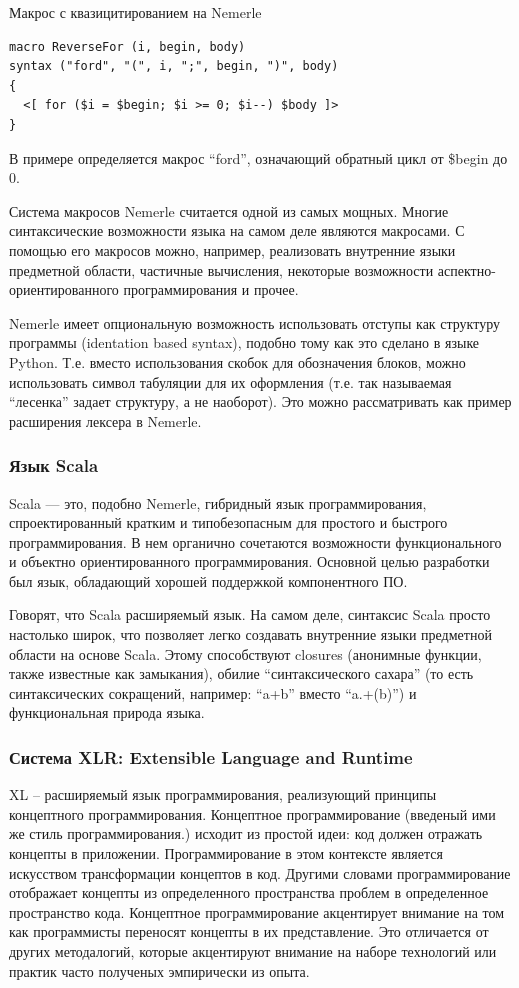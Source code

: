 \documentclass[a4paper,12pt,titlepage]{extarticle}
\begin{document}
Макрос с квазицитированием на Nemerle
\begin{verbatim}
macro ReverseFor (i, begin, body) 
syntax ("ford", "(", i, ";", begin, ")", body)
{
  <[ for ($i = $begin; $i >= 0; $i--) $body ]>
}
\end{verbatim}
В примере определяется макрос ``ford'', означающий обратный цикл от \$begin до
0.

Система макросов Nemerle считается одной из самых мощных. Многие
синтаксические возможности языка на самом деле являются макросами. С помощью
его макросов можно, например, реализовать внутренние языки предметной области,
частичные вычисления, некоторые возможности аспектно-ориентированного
программирования и прочее.

Nemerle имеет опциональную возможность использовать отступы как структуру
программы (identation based syntax), подобно тому как это сделано в языке
Python. Т.е. вместо использования скобок для обозначения блоков, можно
использовать символ табуляции для их оформления (т.е. так называемая
``лесенка'' задает структуру, а не наоборот). Это можно рассматривать как
пример расширения лексера в Nemerle.

\subsubsection*{Язык Scala}
Scala — это, подобно Nemerle, гибридный язык программирования, спроектированный
кратким и типобезопасным для простого и быстрого программирования. В нем органично
сочетаются возможности функционального и объектно ориентированного
программирования. Основной целью разработки был язык, обладающий хорошей
поддержкой компонентного ПО.

Говорят, что Scala расширяемый язык. На самом деле, синтаксис Scala просто
настолько широк, что позволяет легко создавать внутренние языки предметной
области на основе Scala. Этому способствуют closures (анонимные функции, также
известные как замыкания), обилие ``синтаксического сахара'' (то есть
синтаксических сокращений, например: ``a+b'' вместо ``a.+(b)'') и
функциональная природа языка.

\subsubsection*{Система XLR: Extensible Language and Runtime}
\label{xlr}
XL -- расширяемый язык программирования, реализующий принципы концептного
программирования. Концептное программирование (введеный ими же стиль
программирования.) исходит из простой идеи: код должен отражать концепты в
приложении. Программирование в этом контексте является искусством трансформации
концептов в код. Другими словами программирование отображает концепты из
определенного пространства проблем в определенное пространство кода. Концептное
программирование акцентирует внимание на том как программисты переносят
концепты в их представление. Это отличается от других методалогий, которые
акцентируют внимание на наборе технологий или практик часто полученых
эмпирически из опыта.
\end{document}
